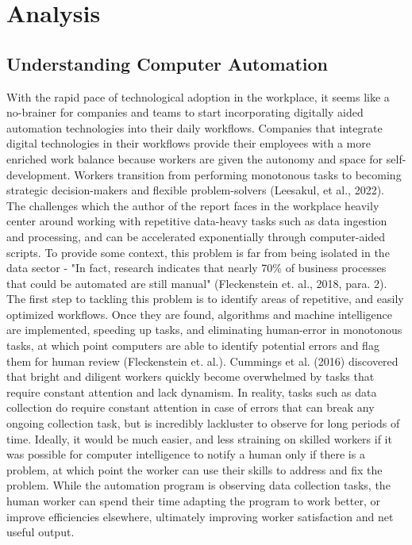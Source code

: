 \documentclass[12pt]{article}
\begin{document}
\newpage
\section{Analysis} 


\subsection{Understanding Computer Automation}
\indent\hspace{0.5in} With the rapid pace of technological adoption in the workplace, it seems like a no-brainer for companies and teams to start incorporating digitally aided automation technologies into their daily workflows. Companies that integrate digital technologies in their workflows provide their employees with a more enriched work balance because workers are given the autonomy and space for self-development. Workers transition from performing monotonous tasks to becoming strategic decision-makers and flexible problem-solvers (Leesakul, et al., 2022). The challenges which the author of the report faces in the workplace heavily center around working with repetitive data-heavy tasks such as data ingestion and processing, and can be accelerated exponentially through computer-aided scripts. To provide some context, this problem is far from being isolated in the data sector - "In fact, research indicates that nearly 70\% of business processes that could be automated are still manual" (Fleckenstein et. al., 2018, para. 2). The first step to tackling this problem is to identify areas of repetitive, and easily optimized workflows. Once they are found, algorithms and machine intelligence are implemented, speeding up tasks, and eliminating human-error in monotonous tasks, at which point computers are able to identify potential errors and flag them for human review (Fleckenstein et. al.).  Cummings et al. (2016) discovered that bright and diligent workers quickly become overwhelmed by tasks that require constant attention and lack dynamism. In reality, tasks such as data collection do require constant attention in case of errors that can break any ongoing collection task, but is incredibly lackluster to observe for long periods of time. Ideally, it would be much easier, and less straining on skilled workers if it was possible for computer intelligence to notify a human only if there is a problem, at which point the worker can use their skills to address and fix the problem. While the automation program is observing data collection tasks, the human worker can spend their time adapting the program to work better, or improve efficiencies elsewhere, ultimately improving worker satisfaction and net useful output. 
\end{document}
